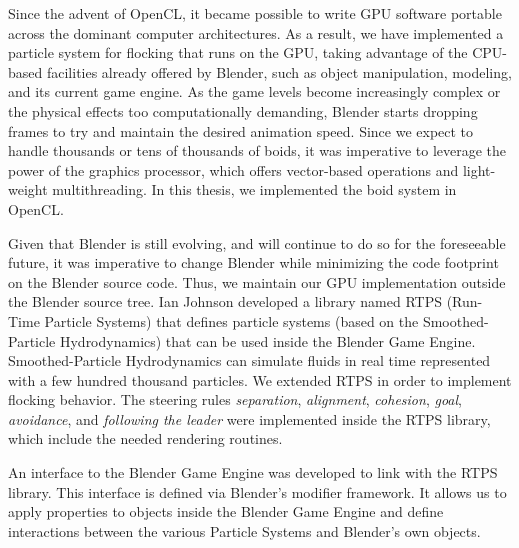 Since the advent of OpenCL\cite{opencl}, it became possible to write GPU software portable across the dominant computer architectures. As a result, we have implemented a particle system for flocking that runs on the GPU, taking advantage of the CPU-based facilities already offered by Blender, such as object manipulation, modeling, and its current game engine. As the game levels  become increasingly complex or the physical effects too computationally demanding, Blender starts dropping frames to try and maintain the desired animation speed. Since we expect to handle thousands or tens of thousands of boids, it was imperative to leverage the power of the graphics processor\cite{nvidiaGPU}, which offers vector-based operations and light-weight multithreading. In this thesis, we implemented the boid system in OpenCL.



Given that Blender is still evolving, and will continue to do so for the foreseeable future, it was imperative to change Blender while minimizing the code footprint on the Blender source code. Thus, we maintain our 
GPU implementation outside the Blender source tree. Ian Johnson\cite{ianBlog} developed a library named RTPS (Run-Time Particle Systems) that defines particle systems (based on the Smoothed-Particle Hydrodynamics) that can be used inside the Blender Game Engine. Smoothed-Particle Hydrodynamics can simulate fluids in real time represented with a few hundred thousand particles. We extended RTPS in order to implement flocking behavior. The steering rules \textit{separation}, \textit{alignment}, \textit{cohesion}, \textit{goal}, \textit{avoidance}, and \textit{following the leader} were implemented inside the RTPS library, which include the needed rendering routines.



An interface to the Blender Game Engine was developed to link with the RTPS library. This interface is defined via Blender's modifier framework. It allows us to apply properties to objects inside the Blender Game Engine and define interactions between the various Particle Systems and Blender's own objects.

